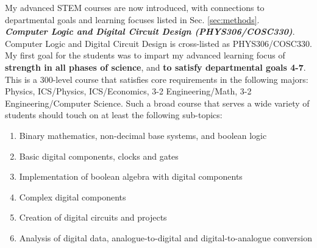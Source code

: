 \documentclass[../../../main.tex]{subfiles}
\begin{document}
My advanced STEM courses are now introduced, with connections to departmental goals and learning focuses listed in Sec. \ref{sec:methods}.
\\
\vspace{0.15cm}
\textbf{\textit{Computer Logic and Digital Circuit Design (PHYS306/COSC330)}}. Computer Logic and Digital Circuit Design is cross-listed as PHYS306/COSC330.  My first goal for the students was to impart my advanced learning focus of \textbf{strength in all phases of science}, and \textbf{to satisfy departmental goals 4-7}.  This is a 300-level course that satisfies core requirements in the following majors: Physics, ICS/Physics, ICS/Economics, 3-2 Engineering/Math, 3-2 Engineering/Computer Science.  Such a broad course that serves a wide variety of students should touch on at least the following sub-topics:

\begin{enumerate}
\item Binary mathematics, non-decimal base systems, and boolean logic
\item Basic digital components, clocks and gates
\item Implementation of boolean algebra with digital components
\item Complex digital components
\item Creation of digital circuits and projects
\item Analysis of digital data, analogue-to-digital and digital-to-analogue conversion
\end{enumerate}
\end{document}
